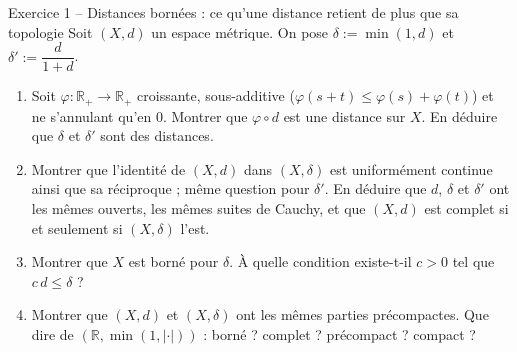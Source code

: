 \documentclass[11pt,a4paper]{article}
\newcommand{\R}{\mathbb{R}}
\theoremstyle{definition}
\begin{document}
\begin{exo}{Exercice 1 -- Distances bornées : ce qu'une distance retient de plus que sa topologie}
Soit $(X,d)$ un espace métrique. On pose $\delta:=\min(1,d)$ et $\delta':=\dfrac d{1+d}$.
\begin{enumerate}[label=(\alph*)]
  \item Soit $\varphi:\R_+\to\R_+$ croissante, sous-additive ($\varphi(s+t)\le\varphi(s)+\varphi(t)$) et ne s'annulant qu'en $0$. Montrer que $\varphi\circ d$ est une distance sur $X$. En déduire que $\delta$ et $\delta'$ sont des distances.
  \item Montrer que l'identité de $(X,d)$ dans $(X,\delta)$ est uniformément continue ainsi que sa réciproque ; même question pour $\delta'$. En déduire que $d$, $\delta$ et $\delta'$ ont les mêmes ouverts, les mêmes suites de Cauchy, et que $(X,d)$ est complet si et seulement si $(X,\delta)$ l'est.
  \item Montrer que $X$ est borné pour $\delta$. À quelle condition existe-t-il $c>0$ tel que $c\,d\le\delta$ ?
  \item Montrer que $(X,d)$ et $(X,\delta)$ ont les mêmes parties précompactes. Que dire de $(\R,\min(1,|\cdot|))$ : borné ? complet ? précompact ? compact ?
\end{enumerate}
\end{exo}
\end{document}
